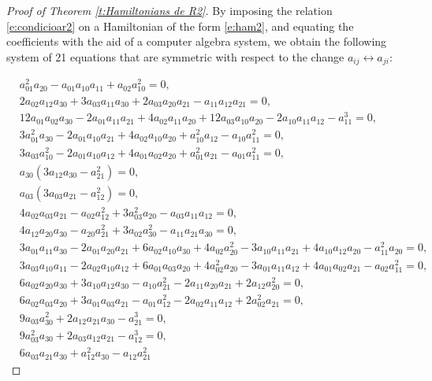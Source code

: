 \documentclass[11pt]{article}
\begin{document}
\begin{proof}[Proof of Theorem \ref{t:Hamiltonians de R2}]
By imposing the relation \eqref{e:condicioar2} on a Hamiltonian of the form \eqref{e:ham2}, and equating the coefficients with the aid of a computer algebra system, we obtain the following system of 21 equations that are symmetric with respect to the change $ a_{ij} \leftrightarrow a_{ji}$:  

\begin{align*}
&a_{01}^{2} a_{20}-a_{01} a_{10} a_{11}+a_{02} a_{10}^{2}=0,\\ 
& 2 a_{02} a_{12} a_{30}+3 a_{03} a_{11} a_{30}+2 a_{03} a_{20} a_{21}- a_{11} a_{12} a_{21}
=0,\\ 
& 12 a_{01} a_{02} a_{30}-2 a_{01} a_{11} a_{21}+4 a_{02} a_{11} a_{20}+12 a_{03} a_{10} a_{20}-2 a_{10} a_{11} a_{12}-a_{11}^{3}=0,\\
& 3 a_{01}^{2} a_{30}-2 a_{01} a_{10} a_{21}+4 a_{02} a_{10} a_{20}+a_{10}^{2} a_{12}-a_{10} a_{11}^{2}
=0,\\ 
& 3 a_{03} a_{10}^{2}-2 a_{01} a_{10} a_{12}+4 a_{01} a_{02} a_{20}+a_{01}^{2} a_{21}-a
_{01} a_{11}^{2}=0,\\ 
&  a_{30} \left(3 a_{12} a_{30}-a_{21}^{2}\right)=0,\\ 
& a_{03} \left(3 a_{03} a_{21}-a_{12}^{2}\right)=0,\\ 
& 
4 a_{02} a_{03} a_{21}- a_{02} a_{12}^{2}+3 a_{03}^{2} a_{20}- a_{03} a_{11} a_{12}
=0,\\ 
& 4 a_{12} a_{20} a_{30}- a_{20} a_{21}^{2}+3 a_{02} a_{30}^{2}- a_{11} a_{21} a_{30}
=0,\\ 
& 3 a_{01} a_{11} a_{30}-2 a_{01} a_{20} a_{21}+6 a_{02} a_{10} a_{30}+4 a_{02} a_{20}^{2}-3 a_{10} a_{11} a_{21}+4 a_{10} a_{12} a_{20}-a_{11}^{2} a_{20}
=0,\\ 
&3 a_{03} a_{10} a_{11}-2 a_{02} a_{10} a_{12}+6 a_{01} a_{03} a_{20}+4 a_{02}^{2} a_{20}-3 a_{01} a_{11} a_{12}+ 4 a_{01} a_{02} a_{21}-a_{02} a_{11}^{2}
=0,\\ 
& 6 a_{02} a_{20} a_{30}+3 a_{10} a_{12} a_{30}- a_{10} a_{21}^{2}-2 a_{11} a_{20} a_{21}+2 a_{12} a_{20}^{2}
=0,\\ 
& 6 a_{02} a_{03} a_{20}+3 a_{01} a_{03} a_{21}- a_{01} a_{12}^{2}-2 a_{02} a_{11} a_{12}+2 a_{02}^{2} a_{21}
=0,\\ 
& 9 a_{03} a_{30}^{2}+2 a_{12} a_{21} a_{30}- a_{21}^{3}=0,\\ 
& 9 a_{03}^{2} a_{30}+2 a_{03} a_{12} a_{21}- a_{12}^{3}=0,\\ 
&6 a_{03} a_{21} a_{30}+ a_{12}^{2} a_{30}- a_{12} a_{21}^{2}

\end{align*}
\end{proof}
\end{document}
